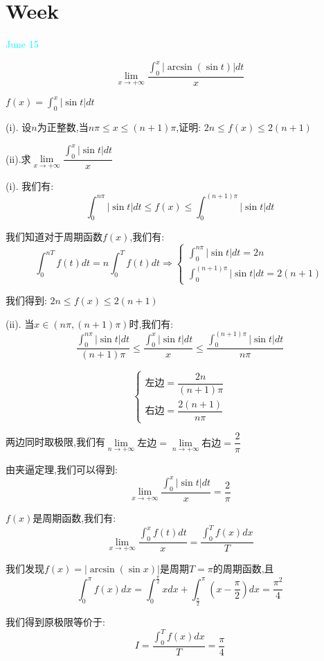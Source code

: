 \section{Week }
\textcolor{cyan}{June 15}

\begin{example}[][Exam: 32.3.1]
	$$\lim\limits_{x\to+\infty}\dfrac{\int_{0}^{x}\big|\arcsin(\sin t)\big|dt}{x}$$
\end{example}
\begin{lemma}[周期函数积分性质]\label{lem: 周期函数积分性质}
	$f(x)=\int_{0}^{x}|\sin t|dt$
	
	(i). 设$n$为正整数,当$n\pi\leq x\leq (n+1)\pi$,证明: $2n\leq f(x)\leq 2(n+1)$
	
	(ii).求$\lim\limits_{x\to+\infty}\dfrac{\int_{0}^{x}|\sin t|dt}{x}$
	\begin{solution}
		
		(i). 我们有: 
		$$\int_{0}^{n\pi}|\sin t|dt\leq f(x)\leq \int_{0}^{(n+1)\pi}|\sin t|dt$$
		
		我们知道对于周期函数$f(x)$,我们有: 
		$$\int_{0}^{nT}f(t)dt=n\int_{0}^{T}f(t)dt\Rightarrow \left\lbrace 
		\begin{array}{l}
			\int_{0}^{n\pi}|\sin t|dt=2n\\
			\int_{0}^{(n+1)\pi}|\sin t|dt=2(n+1)
		\end{array}
		\right. $$
		
		我们得到: $2n\leq f(x)\leq 2(n+1)$
		
		(ii). 当$x\in(n\pi,(n+1)\pi)$时,我们有: 
		$$\dfrac{\int_{0}^{n\pi}|\sin t|dt}{(n+1)\pi}\leq \dfrac{\int_{0}^{x}|\sin t|dt}{x}\leq \dfrac{\int_{0}^{(n+1)\pi}|\sin t|dt}{n\pi}$$
		
		$$\left\lbrace 
		\begin{array}{l}
			\text{左边}=\dfrac{2n}{(n+1)\pi}\\
			\text{右边}=\dfrac{2(n+1)}{n\pi}
		\end{array}
		\right. $$
		
		两边同时取极限,我们有$\lim\limits_{n\to+\infty}\text{左边}=\lim\limits_{n\to+\infty}\text{右边}=\dfrac{2}{\pi}$
		
		由夹逼定理,我们可以得到: 
		$$\lim\limits_{x\to+\infty}\dfrac{\int_{0}^{x}|\sin t|dt}{x}=\dfrac{2}{\pi}$$
	\end{solution}
\end{lemma}
\begin{theorem}[周期函数性质]
	$f(x)$是周期函数,我们有: 
	$$\lim\limits_{x\to+\infty}\dfrac{\int_{0}^{x}f(t)dt}{x}=\dfrac{\int_{0}^{T}f(x)dx}{T}$$
\end{theorem}
\begin{solution}
	
	我们发现$f(x)=|\arcsin (\sin x)|$是周期$T=\pi$的周期函数,且$$\int_{0}^{\pi}f(x)dx=\int_{0}^{\frac{\pi}{2}}xdx+\int_{\frac{\pi}{2}}^{\pi}(x-\dfrac{\pi}{2})dx=\dfrac{\pi^2}{4}$$
	
	我们得到原极限等价于: 
	$$I=\dfrac{\int_{0}^{T}f(x)dx}{T}=\dfrac{\pi}{4}$$
\end{solution}


